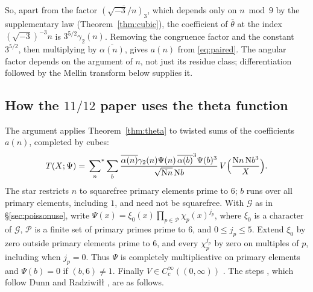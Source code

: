 \documentclass[11pt]{article}
\numberwithin{equation}{section}
\newcommand{\N}{\mathrm N}
\theoremstyle{definition}
\theoremstyle{remark}
\begin{document}
So, apart from the factor $\overline{(\sqrt{-3}/n)_3}$, which depends only on $n\bmod9$ by the supplementary law
(Theorem~\ref{thm:cubic}), the coefficient of $\overline\theta$ at the index $(\sqrt{-3})^{-3}n$ is
$3^{5/2}\gamma_2(n)$. Removing the congruence factor and the constant $3^{5/2}$, then multiplying by
$\overline{\alpha(n)}$, gives $a(n)$ from \eqref{eq:paired}. The angular factor depends on the argument of $n$,
not just its residue class; differentiation followed by the Mellin transform below supplies it.

\subsection{How the \texorpdfstring{$11/12$}{11/12} paper uses the theta function}\label{sec:thetause}
The argument applies Theorem~\ref{thm:theta} to twisted sums of the coefficients
$a(n)$, completed by cubes:
\begin{equation}\label{eq:Tcompleted}
 T(X;\Psi)=\sideset{}{^*}\sum_n\sum_b\frac{\overline{\alpha(n)}\gamma_2(n)\Psi(n)\,\overline{\alpha(b)}^3\Psi(b)^3}{\sqrt{\N n}\,\N b}\,
 V\Bigl(\frac{\N n\,\N b^3}X\Bigr).
\end{equation}
The star restricts $n$ to squarefree primary elements prime to $6$; $b$ runs over all primary elements,
including $1$, and need not be squarefree. With $\mathcal G$ as in \S\ref{sec:poissonuse}, write
$\Psi(x)=\xi_0(x)\prod_{p\in\mathcal P}\chi_p(x)^{j_p}$, where $\xi_0$ is a character of $\mathcal G$,
$\mathcal P$ is a finite set of primary primes prime to $6$, and $0\le j_p\le5$.
Extend $\xi_0$ by zero outside primary elements prime to $6$, and every $\chi_p^{j_p}$ by zero on multiples
of $p$, including when $j_p=0$. Thus $\Psi$ is completely multiplicative on primary elements and
$\Psi(b)=0$ if $(b,6)\ne1$. Finally $V\in C_c^\infty((0,\infty))$ \cite[\S6.2]{QRH}.
The steps \cite[\S6.2, App.~A.2]{QRH}, which follow Dunn and Radziwi\l\l{} \cite[\S5]{DR}, are as follows.
\end{document}
